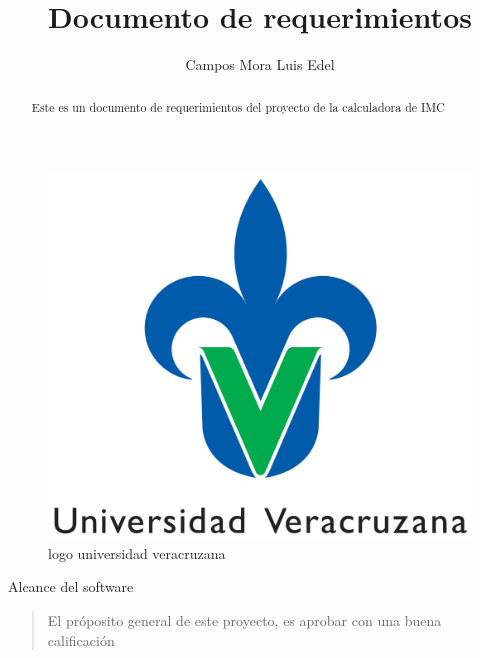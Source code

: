 \documentclass[a4paper, 12pt]{article}
\title{Documento de requerimientos}
\author{Campos Mora Luis Edel}
\begin{document}
\begin{figure}
\caption{logo universidad veracruzana}
\centering
\includegraphics[scale=1]{Logo-UV.jpg} 




\end{figure}
\begin{abstract}
Este es un documento de requerimientos del proyecto de la calculadora de IMC
\end{abstract}
Alcance del software
\begin{verse}	

	El próposito general de este proyecto, es aprobar con una buena calificación 	 
\end{verse}
\end{document}
